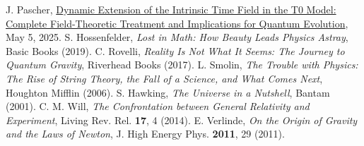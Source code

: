 \documentclass[12pt,a4paper]{article}
\begin{document}
\begin{thebibliography}{99}
		 J. Pascher, \href{https://github.com/jpascher/T0-Time-Mass-Duality/tree/main/2/pdf/English/DynamicTF-SchrodingerExtensions_En.pdf}{Dynamic Extension of the Intrinsic Time Field in the T0 Model: Complete Field-Theoretic Treatment and Implications for Quantum Evolution}, May 5, 2025.
		 S. Hossenfelder, \textit{Lost in Math: How Beauty Leads Physics Astray}, Basic Books (2019).
		 C. Rovelli, \textit{Reality Is Not What It Seems: The Journey to Quantum Gravity}, Riverhead Books (2017).
		 L. Smolin, \textit{The Trouble with Physics: The Rise of String Theory, the Fall of a Science, and What Comes Next}, Houghton Mifflin (2006).
		 S. Hawking, \textit{The Universe in a Nutshell}, Bantam (2001).
		 C. M. Will, \textit{The Confrontation between General Relativity and Experiment}, Living Rev. Rel. \textbf{17}, 4 (2014).
		 E. Verlinde, \textit{On the Origin of Gravity and the Laws of Newton}, J. High Energy Phys. \textbf{2011}, 29 (2011).
	\end{thebibliography}
	
\end{document}
